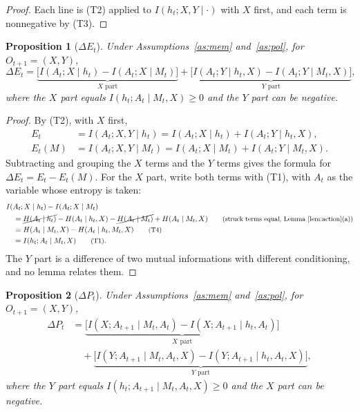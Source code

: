 \documentclass{article}
\newtheorem{proposition}{Proposition}[section]
\theoremstyle{definition}
\theoremstyle{remark}
\newcommand{\dE}{\Delta E}
\newcommand{\dP}{\Delta P}
\newcommand{\why}[1]{\tag*{\small(#1)}}
\begin{document}
\begin{proof}
Each line is (T2) applied to $I(h_t;X,Y\mid\cdot)$ with $X$ first, and each term is nonnegative by (T3).
\end{proof}

\begin{proposition}[$\dE_t$]\label{prop:xy-E}
Under Assumptions~\ref{as:mem} and~\ref{as:pol}, for $O_{t+1}=(X,Y)$,
\[
\dE_t=\underbrace{\big[I(A_t;X\mid h_t)-I(A_t;X\mid M_t)\big]}_{X\text{ part}}+\underbrace{\big[I(A_t;Y\mid h_t,X)-I(A_t;Y\mid M_t,X)\big]}_{Y\text{ part}},
\]
where the $X$ part equals $I(h_t;A_t\mid M_t,X)\ge0$ and the $Y$ part can be negative.
\end{proposition}

\begin{proof}
By (T2), with $X$ first,
\begin{align*}
E_t&=I(A_t;X,Y\mid h_t)=I(A_t;X\mid h_t)+I(A_t;Y\mid h_t,X),\\
E_t(M)&=I(A_t;X,Y\mid M_t)=I(A_t;X\mid M_t)+I(A_t;Y\mid M_t,X).
\end{align*}
Subtracting and grouping the $X$ terms and the $Y$ terms gives the formula for $\dE_t=E_t-E_t(M)$. For the $X$ part, write both terms with (T1), with $A_t$ as the variable whose entropy is taken:
\begin{align*}
&I(A_t;X\mid h_t)-I(A_t;X\mid M_t)\\
&\quad=\cancel{H(A_t\mid h_t)}-H(A_t\mid h_t,X)-\cancel{H(A_t\mid M_t)}+H(A_t\mid M_t,X) \why{struck terms equal, Lemma~\ref{lem:action}(a)}\\
&\quad=H(A_t\mid M_t,X)-H(A_t\mid h_t,M_t,X) \why{T4}\\
&\quad=I(h_t;A_t\mid M_t,X) \why{T1}.
\end{align*}
The $Y$ part is a difference of two mutual informations with different conditioning, and no lemma relates them.
\end{proof}

\begin{proposition}[$\dP_t$]\label{prop:xy-P}
Under Assumptions~\ref{as:mem} and~\ref{as:pol}, for $O_{t+1}=(X,Y)$,
\[
\begin{aligned}
\dP_t&=\underbrace{\big[I(X;A_{t+1}\mid M_t,A_t)-I(X;A_{t+1}\mid h_t,A_t)\big]}_{X\text{ part}}\\
&\quad+\underbrace{\big[I(Y;A_{t+1}\mid M_t,A_t,X)-I(Y;A_{t+1}\mid h_t,A_t,X)\big]}_{Y\text{ part}},
\end{aligned}
\]
where the $Y$ part equals $I(h_t;A_{t+1}\mid M_t,A_t,X)\ge0$ and the $X$ part can be negative.
\end{proposition}
\end{document}
